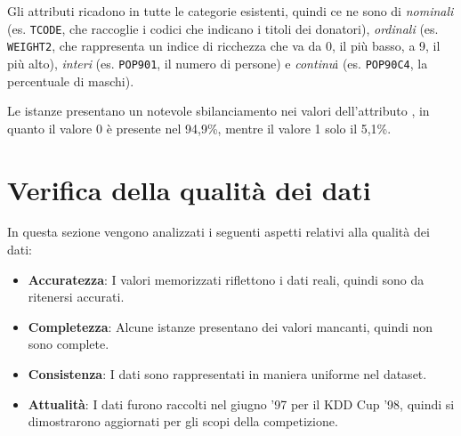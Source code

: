 Gli attributi ricadono in tutte le categorie esistenti, quindi ce ne sono di \emph{nominali} (es. \texttt{TCODE}, che raccoglie i codici che indicano i titoli dei donatori), \emph{ordinali} (es. \texttt{WEIGHT2}, che rappresenta un indice di ricchezza che va da 0, il più basso, a 9, il più alto), \emph{interi} (es. \texttt{POP901}, il numero di persone) e \emph{continu}i (es. \texttt{POP90C4}, la percentuale di maschi).

Le istanze presentano un notevole sbilanciamento nei valori dell'attributo \tb, in quanto il valore 0 è presente nel 94,9\%, mentre il valore 1 solo il 5,1\%.

\section{Verifica della qualità dei dati}
In questa sezione vengono analizzati i seguenti aspetti relativi alla qualità dei dati:

\begin{itemize}
	\item \textbf{Accuratezza}: I valori memorizzati riflettono i dati reali, quindi sono da ritenersi accurati.
	\item \textbf{Completezza}: Alcune istanze presentano dei valori mancanti, quindi non sono complete.
	\item \textbf{Consistenza}: I dati sono rappresentati in maniera uniforme nel dataset.
	\item \textbf{Attualità}: I dati furono raccolti nel giugno '97 per il KDD Cup '98, quindi si dimostrarono aggiornati per gli scopi della competizione.
\end{itemize}

